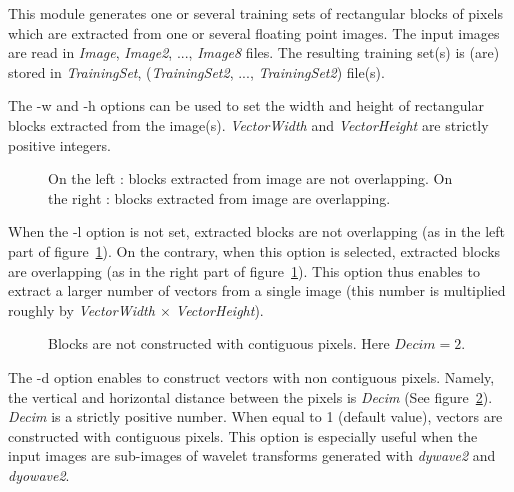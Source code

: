 This module generates one or several training sets of rectangular blocks 
of pixels which are extracted from one or several floating point images. 
The input images are read in {\em Image}, {\em Image2}, ..., {\em Image8} 
files. The resulting training set(s) is (are) stored in {\em TrainingSet}, 
({\em TrainingSet2}, ..., {\em TrainingSet2}) file(s). 

The -w and -h options can be used to set the width and height of rectangular 
blocks extracted from the image(s). {\em VectorWidth} and {\em VectorHeight}
are strictly positive integers. 

\begin{figure}[hbt]
\vspace{0.4cm}
\parbox[t]{6.5cm}{
}
\hspace{0.55cm}
\parbox[t]{6.5cm}{
}
\caption[overlap]{On the left : blocks extracted from image are not overlapping. On the right : blocks extracted from image are overlapping.
\label{fig:overlap}
}
\end{figure}

When the -l option  is not set, extracted blocks are not overlapping 
(as in the left part of figure~\ref{fig:overlap}). On the contrary, 
when this option is selected, extracted blocks are overlapping 
(as in the right part of figure~\ref{fig:overlap}). This option 
thus enables to extract a larger number of vectors from a single image 
(this number is multiplied roughly by 
{\em VectorWidth $\times$ VectorHeight}). 

\begin{figure}[hbt]
\vspace{0.4cm}
\parbox[t]{6.5cm}{
}
\caption[decim]{Blocks are not constructed with contiguous pixels. 
Here $Decim = 2$.
\label{fig:decim}
}
\end{figure}

The -d option enables to construct vectors with non contiguous pixels. 
Namely, the vertical and horizontal distance between the pixels is 
{\em Decim} (See figure~\ref{fig:decim}). {\em Decim} is a strictly positive 
number. When equal to 1 (default value), vectors are constructed 
with contiguous pixels. This option is especially useful when 
the input images are sub-images of wavelet transforms generated with 
{\em dywave2} and {\em dyowave2}.  

